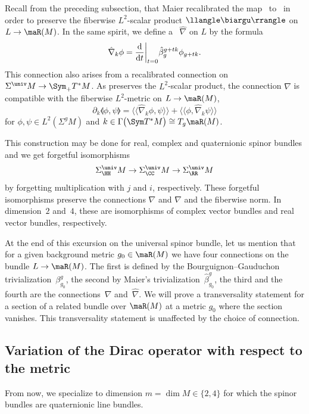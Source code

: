 Recall from the preceding subsection, that Maier recalibrated the map~ to~ in order to preserve the fiberwise $L^2$-scalar product $\llangle\biargu\rrangle$ on~$L\to \maR(M)$.
In the same spirit, we define a~ $\hat\nabla$ on $L$ by the formula
\[\hat\nabla_k\phi=\frac{{\rm d}}{{\rm d}t}\bigg|_{t=0}\hat\beta^{g+tk}_g\phi_{g+tk} .\]
This connection also arises from a recalibrated connection on
 $\Sigma^{\univ} M\to \Sym_+ T^*M$.
 As  preserves the $L^2$-scalar product, the connection $\hat\nabla$ is compatible with the fiberwise $L^2$-metric on $L\to\maR(M)$, \ie
\[\partial_k \llangle\phi,\psi\rrangle= \bigl\langle\!\!\bigl\langle\hat\nabla_k \phi,\psi\bigr\rangle\!\!\bigr\rangle+ \bigl\langle\!\!\bigl\langle\phi,\hat\nabla_k \psi\bigr\rangle\!\!\bigr\rangle\]
for $\phi,\psi\in L^2(\Sigma^g M)$ and $k\in \Gamma\bigl(\Sym T^*M\bigr)\cong T_g\maR(M)$.

This construction may be done for real, complex and quaternionic spinor bundles
and we get forgetful isomorphisms
\[\Sigma^{\univ}_\HH M\to\Sigma^{\univ}_\CC M\to \Sigma^{\univ}_\RR M\]
by forgetting multiplication with $j$ and $i$, respectively. These forgetful isomorphisms preserve the connections $\nabla$ and $\hat\nabla$ and the fiberwise norm. In dimension~$2$ and~$4$, these are isomorphisms of complex vector bundles and real vector bundles, respectively.

At the end of this excursion on the universal spinor bundle,
let us mention that for a given background metric $g_0\in \maR(M)$ we have four connections on the bundle $L \to \maR(M)$.
The first is defined by the Bourguignon--Gauduchon trivialization~$\beta_{g_0}^g$, the second by Maier's trivialization~$\hat\beta_{g_0}^g$, the third and the fourth are the connections~$\nabla$ and~$\hat\nabla$.
We will prove a transversality statement for a section of a related bundle over $\maR(M)$ at a metric $g_0$ where the section vanishes.
This transversality statement is unaffected by the choice of connection.

\subsection{Variation of the Dirac operator with respect to the metric} \label{subsec:variation.of.D}

From now, we specialize to dimension $m=\dim M\in \{2,4\}$ for which the spinor bundles are quaternionic line bundles.

